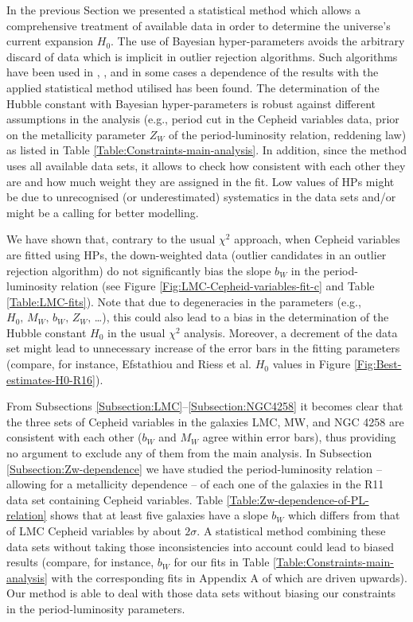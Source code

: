 In the previous Section we presented a statistical method which allows a comprehensive treatment of available data in order to determine the universe's current expansion $H_0$. The use of Bayesian hyper-parameters avoids the arbitrary discard of data which is implicit in outlier rejection algorithms. Such algorithms have been used in  \cite{Riess:2009pu}, \cite{Riess:2011yx}, \cite{Efstathiou:2013via} and in some cases a dependence of the results with the applied statistical method utilised has been found. The determination of the Hubble constant with Bayesian hyper-parameters is robust against different assumptions in the analysis (e.g., period cut in the Cepheid variables data, prior on the metallicity parameter $Z_W$ of the period-luminosity relation, reddening law) as listed in Table \ref{Table:Constraints-main-analysis}. In addition, since the method uses all available data sets, it allows to check how consistent with each other they are and how much weight they are assigned in the fit. Low values of HPs might be due to unrecognised (or underestimated) systematics in the data sets and/or might be a calling for better modelling.

We have shown that, contrary to the usual $\chi^2$ approach, when Cepheid variables are fitted using HPs, the down-weighted data (outlier candidates in an outlier rejection algorithm) do not significantly bias the slope $b_W$ in the period-luminosity relation (see Figure \ref{Fig:LMC-Cepheid-variables-fit-c} and Table \ref{Table:LMC-fits}). Note that due to degeneracies in the parameters (e.g., $H_0,\, M_W,\, b_W,\, Z_W,\,$\dots), this could also lead to a bias in the determination of the Hubble constant $H_0$ in the usual $\chi^2$ analysis. Moreover, a decrement of the data set might lead to unnecessary increase of the error bars in the fitting parameters (compare, for instance, Efstathiou \cite{Efstathiou:2013via} and Riess et al. \cite{Riess:2011yx} $H_0$ values in Figure \ref{Fig:Best-estimates-H0-R16}).

From Subsections \ref{Subsection:LMC}--\ref{Subsection:NGC4258} it becomes clear that the three sets of Cepheid variables in the galaxies LMC, MW, and NGC 4258 are consistent with each other ($b_W$ and $M_W$ agree within error bars), thus providing no argument to exclude any of them from the main analysis. In Subsection \ref{Subsection:Zw-dependence} we have studied the period-luminosity relation -- allowing for a metallicity dependence -- of each one of the galaxies in the R11 data set containing Cepheid variables. Table \ref{Table:Zw-dependence-of-PL-relation} shows that at least five galaxies have a slope $b_W$ which differs from that of LMC Cepheid variables by about $2\sigma$. A statistical method combining these data sets without taking those inconsistencies into account could lead to biased results (compare, for instance, $b_W$ for our fits in Table \ref{Table:Constraints-main-analysis} with the corresponding fits in Appendix A of \cite{Efstathiou:2013via} which are driven upwards). Our method is able to deal with those data sets without biasing our constraints in the period-luminosity parameters.

